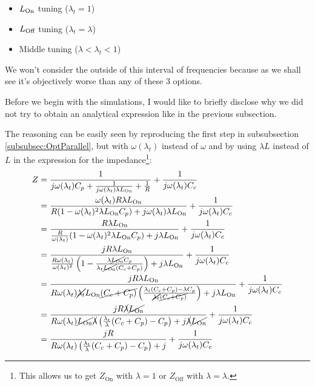 \documentclass[../main.tex]{subfiles}
\begin{document}
\begin{itemize}[]
    \item \(L_{\text{On}}\) tuning (\(\lambda_{t} = 1\))
    \item \(L_{\text{Off}}\) tuning (\(\lambda_{t} = \lambda\))
    \item Middle tuning (\(\lambda < \lambda_{t} < 1\))
\end{itemize}

We won't consider the outside of this interval of frequencies because as we
shall see it's objectively worse than any of these 3 options.

Before we begin with the simulations, I would like to briefly disclose why
we did not try to obtain an analytical expression like in the previous
subsection.

The reasoning can be easily seen by reproducing the first step in subsubsection
\ref{subsubsec:OptParallel}, but with \(\omega(\lambda_{t})\) instead of
\(\omega\) and by using \(\lambda L\) instead of \(L\) in the expression
for the impedance\footnote{This allows us to get \(Z_{\text{On}}\) with
\(\lambda = 1\) or \(Z_{\text{Off}}\) with \(\lambda = \lambda\).}:
\begin{align*}
\label{eq:ImpKineticResonant}
\begin{split}
    Z &= \frac{1}{j \omega(\lambda_{t}) C_{p} + \frac{1}{j \omega(\lambda_{t}) \lambda L_{\text{On}}} + \frac{1}{R}}
        + \frac{1}{j \omega(\lambda_{t}) C_{c}}\\
      &= \frac{\omega(\lambda_{t}) R \lambda L_{\text{On}}}{R(1 - \omega(\lambda_{t})^2 \lambda L_{\text{On}} C_{p}) + j \omega(\lambda_{t}) \lambda L_{\text{On}}}
        + \frac{1}{j \omega(\lambda_{t}) C_{c}}\\
      &= \frac{R \lambda L_{\text{On}}}{\frac{R}{\omega(\lambda_{t})}(1 - \omega(\lambda_{t})^2 \lambda L_{\text{On}} C_{p}) + j \lambda L_{\text{On}}}
        + \frac{1}{j \omega(\lambda_{t}) C_{c}}\\
      &= \frac{j R \lambda L_{\text{On}}}{
          \frac{R\omega(\lambda_{t})}{\omega(\lambda_{t})^2}\left(1 - \frac{\lambda\cancel{L_{\text{On}}} C_{p}}{\lambda_{t}\cancel{L_{\text{On}}}(C_{c} + C_{p})}\right)
            + j \lambda L_{\text{On}}} + \frac{1}{j \omega(\lambda_{t})C_{c}}\\
      &= \frac{j R \lambda L_{\text{On}}}{
          R\omega(\lambda_{t})\cancel{\lambda_{t}}L_{\text{On}}\cancel{(C_{c} + C_{p})}
          \left(\frac{\lambda_{t}(C_{c} + C_{p}) - \lambda C_{p}}{\cancel{\lambda_{t}}\cancel{(C_{c} + C_{p})}}\right)
            + j \lambda L_{\text{On}}} + \frac{1}{j \omega(\lambda_{t})C_{c}}\\
      &= \frac{j R \cancel{\lambda}\cancel{L_{\text{On}}}}{
          R\omega(\lambda_{t})\cancel{L_{\text{On}}}\cancel{\lambda}
          \left(\frac{\lambda_{t}}{\lambda}(C_{c} + C_{p}) - C_{p}\right)
          + j \cancel{\lambda}\cancel{L_{\text{On}}}} + \frac{1}{j \omega(\lambda_{t})C_{c}}\\
      &= \frac{j R }{
          R\omega(\lambda_{t})
          \left(\frac{\lambda_{t}}{\lambda}(C_{c} + C_{p}) - C_{p}\right)
          + j } + \frac{1}{j \omega(\lambda_{t})C_{c}}\\
\end{split}
\end{align*}
\end{document}
